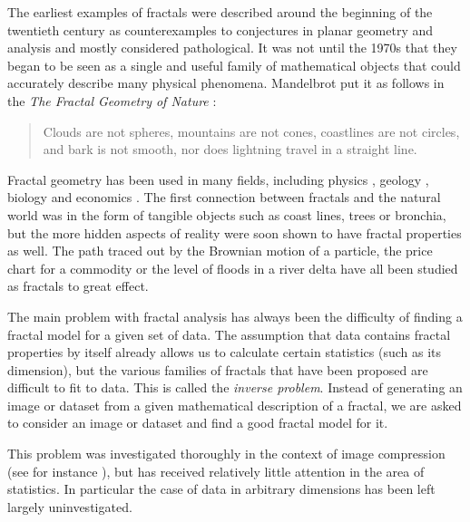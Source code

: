\documentclass[10pt,a4paper,oneside]{article}
\theoremstyle{definition}
\begin{document}
The earliest examples of fractals were described around the beginning of the twentieth century as counterexamples to conjectures in planar geometry and analysis and mostly considered pathological. It was not until the 1970s that they began to be seen as a single and useful family of mathematical objects that could accurately describe many physical phenomena. Mandelbrot put it as follows in the \emph{The Fractal Geometry of Nature} \cite{mandelbrot1982fractal}:

\begin{quotation}
\small
\noindent Clouds are not spheres, mountains are not cones, coastlines are not circles, and bark is not smooth, nor does lightning travel in a straight line.
\end{quotation}

Fractal geometry has been used in many fields, including physics \cite{mandelbrot1984fractals}, geology \cite{cheng1997multifractal}, biology \cite{goldberger1992fractal} and economics \cite{turiel2003multifractal}. The first connection between fractals and the natural world was in the form of tangible objects such as coast lines, trees or bronchia, but the more hidden aspects of reality were soon shown to have fractal properties as well. The path traced out by the Brownian motion of a particle, the price chart for a commodity or the level of floods in a river delta have all been studied as fractals to great effect.

The main problem with fractal analysis has always been the difficulty of finding a fractal model for a given set of data. The assumption that data contains fractal properties by itself already allows us to calculate certain statistics (such as its dimension), but the various families of fractals that have been proposed are difficult to fit to data. This is called the \emph{inverse problem}. Instead of generating an image or dataset from a given mathematical description of a fractal, we are asked to consider an image or dataset and find a good fractal model for it.

This problem was investigated thoroughly in the context of image compression (see for instance \cite{hart1996fractal}), but has received relatively little attention in the area of statistics. In particular the case of data in arbitrary dimensions has been left largely uninvestigated.

\end{document}

